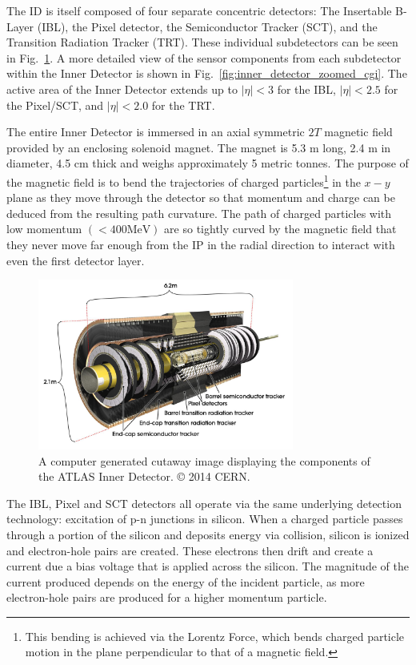 The ID is itself composed of four separate concentric detectors: The Insertable B-Layer (IBL), the Pixel detector, the Semiconductor Tracker (SCT), and the Transition Radiation Tracker (TRT).
These individual subdetectors can be seen in Fig.~\ref{fig:inner_detector_cgi}.
A more detailed view of the sensor components from each subdetector within the Inner Detector is shown in Fig.~\ref{fig:inner_detector_zoomed_cgi}.
The active area of the Inner Detector extends up to $|\eta| < 3$ for the IBL, $|\eta| < 2.5$ for the Pixel/SCT, and $|\eta| < 2.0$ for the TRT.

The entire Inner Detector is immersed in an axial symmetric $2T$ magnetic field provided by an enclosing solenoid magnet.
The magnet is 5.3 m long, 2.4 m in diameter, 4.5 cm thick and weighs approximately 5 metric tonnes.
The purpose of the magnetic field is to bend the trajectories of charged particles\footnote{This bending is achieved via the Lorentz Force, which bends charged particle motion in the plane perpendicular to that of a magnetic field.} in the $x-y$ plane as they move through the detector so that momentum and charge can be deduced from the resulting path curvature.
The path of charged particles with low momentum $(< 400 \mathrm{MeV})$ are so tightly curved by the magnetic field that they never move far enough from the IP in the radial direction to interact with even the first detector layer.

\begin{figure}
	\centering
	\includegraphics[width=0.75\textwidth]{inner_detector}
	\caption{A computer generated cutaway image displaying the components of the ATLAS Inner Detector. © 2014 CERN.}
	\label{fig:inner_detector_cgi}
\end{figure}

The IBL, Pixel and SCT detectors all operate via the same underlying detection technology: excitation of p-n junctions in silicon.
When a charged particle passes through a portion of the silicon and deposits energy via collision, silicon is ionized and electron-hole pairs are created.
These electrons then drift and create a current due a bias voltage that is applied across the silicon.
The magnitude of the current produced depends on the energy of the incident particle, as more electron-hole pairs are produced for a higher momentum particle.

